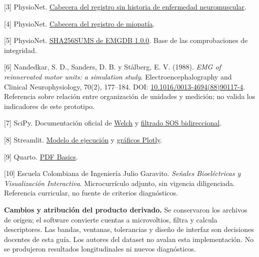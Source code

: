 \documentclass[
  spanish,
  10.5pt,
  a4paper,
  DIV=11,
  numbers=noendperiod]{scrartcl}
\begin{document}
{[}3{]} PhysioNet.
\href{https://physionet.org/files/emgdb/1.0.0/emg_healthy.hea}{Cabecera
del registro sin historia de enfermedad neuromuscular}.

{[}4{]} PhysioNet.
\href{https://physionet.org/files/emgdb/1.0.0/emg_myopathy.hea}{Cabecera
del registro de miopatía}.

{[}5{]} PhysioNet.
\href{https://physionet.org/files/emgdb/1.0.0/SHA256SUMS.txt}{SHA256SUMS
de EMGDB 1.0.0}. Base de las comprobaciones de integridad.

{[}6{]} Nandedkar, S. D., Sanders, D. B. y Stålberg, E. V. (1988).
\emph{EMG of reinnervated motor units: a simulation study}.
Electroencephalography and Clinical Neurophysiology, 70(2), 177--184.
DOI:
\href{https://doi.org/10.1016/0013-4694(88)90117-4}{10.1016/0013-4694(88)90117-4}.
Referencia sobre relación entre organización de unidades y medición; no
valida los indicadores de este prototipo.

{[}7{]} SciPy. Documentación oficial de
\href{https://docs.scipy.org/doc/scipy/reference/generated/scipy.signal.welch.html}{Welch}
y
\href{https://docs.scipy.org/doc/scipy/reference/generated/scipy.signal.sosfiltfilt.html}{filtrado
SOS bidireccional}.

{[}8{]} Streamlit.
\href{https://docs.streamlit.io/develop/concepts/architecture}{Modelo de
ejecución} y
\href{https://docs.streamlit.io/develop/api-reference/charts/st.plotly_chart}{gráficos
Plotly}.

{[}9{]} Quarto.
\href{https://quarto.org/docs/output-formats/pdf-basics.html}{PDF
Basics}.

{[}10{]} Escuela Colombiana de Ingeniería Julio Garavito. \emph{Señales
Bioeléctricas y Visualización Interactiva}. Microcurrículo adjunto, sin
vigencia diligenciada. Referencia curricular, no fuente de criterios
diagnósticos.

\textbf{Cambios y atribución del producto derivado.} Se conservaron los
archivos de origen; el software convierte cuentas a microvoltios, filtra
y calcula descriptores. Las bandas, ventanas, tolerancias y diseño de
interfaz son decisiones docentes de esta guía. Los autores del dataset
no avalan esta implementación. No se produjeron resultados
longitudinales ni nuevos diagnósticos.
\end{document}
